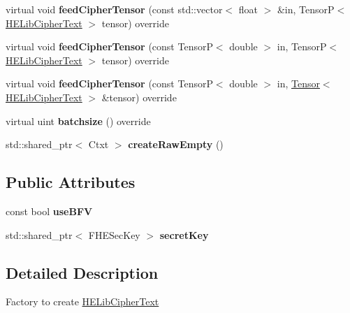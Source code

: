 \begin{DoxyCompactItemize}
virtual void {\bfseries feed\+Cipher\+Tensor} (const std\+::vector$<$ float $>$ \&in, TensorP$<$ \hyperlink{classHELibCipherText}{H\+E\+Lib\+Cipher\+Text} $>$ tensor) override
\item 
\mbox{\label{classHELibCipherTextFactory_a4a2d8cbb37e7875a8b155f746852a244}} 
virtual void {\bfseries feed\+Cipher\+Tensor} (const TensorP$<$ double $>$ in, TensorP$<$ \hyperlink{classHELibCipherText}{H\+E\+Lib\+Cipher\+Text} $>$ tensor) override
\item 
\mbox{\label{classHELibCipherTextFactory_a609fb203aa9f501cc40394ba493c3d7c}} 
virtual void {\bfseries feed\+Cipher\+Tensor} (const TensorP$<$ double $>$ in, \hyperlink{classTensor}{Tensor}$<$ \hyperlink{classHELibCipherText}{H\+E\+Lib\+Cipher\+Text} $>$ \&tensor) override
\item 
\mbox{\label{classHELibCipherTextFactory_a0a1fe02c7af26a6fbcbfe2e6e1f362af}} 
virtual uint {\bfseries batchsize} () override
\item 
\mbox{\label{classHELibCipherTextFactory_aa34268733c1b1497835d0014db8d13cd}} 
std\+::shared\+\_\+ptr$<$ Ctxt $>$ {\bfseries create\+Raw\+Empty} ()
\end{DoxyCompactItemize}
\subsection*{Public Attributes}
\begin{DoxyCompactItemize}
\item 
\mbox{\label{classHELibCipherTextFactory_a73742cada3eb2d6e1d6ac834de1b3ad0}} 
const bool {\bfseries use\+B\+FV}
\item 
\mbox{\label{classHELibCipherTextFactory_aeb8b7ecb78a46467b70d0af21dbcc4ed}} 
std\+::shared\+\_\+ptr$<$ F\+H\+E\+Sec\+Key $>$ {\bfseries secret\+Key}
\end{DoxyCompactItemize}


\subsection{Detailed Description}
Factory to create {\ttfamily \hyperlink{classHELibCipherText}{H\+E\+Lib\+Cipher\+Text}}

